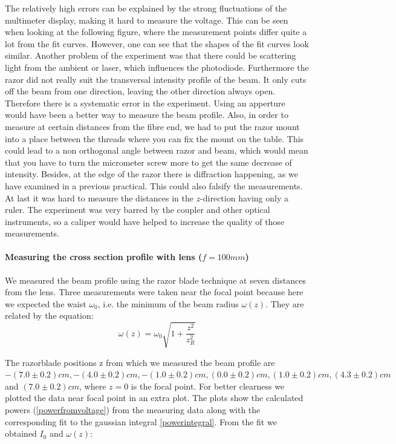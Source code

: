 \documentclass{article}
\begin{document}
The relatively high errors can be explained by the strong fluctuations of the multimeter display, making it hard to measure the voltage. This can be seen when looking at the following figure, where the measurement points differ quite a lot from the fit curves. However, one can see that the shapes of the fit curves look similar. Another problem of the experiment was that there could be scattering light from the ambient or laser, which influences the photodiode. Furthermore the razor did not really suit the transversal intensity profile of the beam. It only cuts off the beam from one direction, leaving the other direction always open. Therefore there is a systematic error in the experiment. Using an apperture would have been a better way to measure the beam profile. Also, in order to measure at certain distances from the fibre end, we had to put the razor mount into a place between the threads where you can fix the mount on the table. This could lead to a non orthogonal angle between razor and beam, which would mean that you have to turn the micrometer screw more to get the same decrease of intensity. Besides, at the edge of the razor there is diffraction happening, as we have examined in a previous practical. This could also falsify the measurements. At last it was hard to measure the distances in the $z$-direction having only a ruler. The experiment was very barred by the coupler and other optical instruments, so a caliper would have helped to increase the quality of those measurements.

\paragraph{Measuring the cross section profile with lens ($f=100mm$)}

We measured the beam profile using the razor blade technique at seven distances from the lens. Three measurements were taken near the focal point because here we expected the waist $\omega_{0}$, i.e. the minimum of the beam radius $\omega (z)$. They are related by the equation:
\begin{equation}
\omega (z) = \omega_{0}\sqrt{1+\frac{z^2}{z_{R}^2}}
\label{omegaofz}
\end{equation}

The razorblade positions z from which we measured the beam profile are $-(7.0\pm 0.2)cm, -(4.0\pm 0.2)cm, -(1.0\pm 0.2)cm, (0.0\pm 0.2)cm, (1.0\pm 0.2)cm, (4.3\pm 0.2) cm$ and $(7.0\pm 0.2)cm$, where $z=0$ is the focal point. For better clearness we plotted the data near focal point in an extra plot. The plots show the calculated powers (\ref{powerfromvoltage}) from the measuring data along with the corresponding fit to the gaussian integral \ref{powerintegral}. From the fit we obtained $I_{0}$ and $\omega(z)$:
\end{document}
